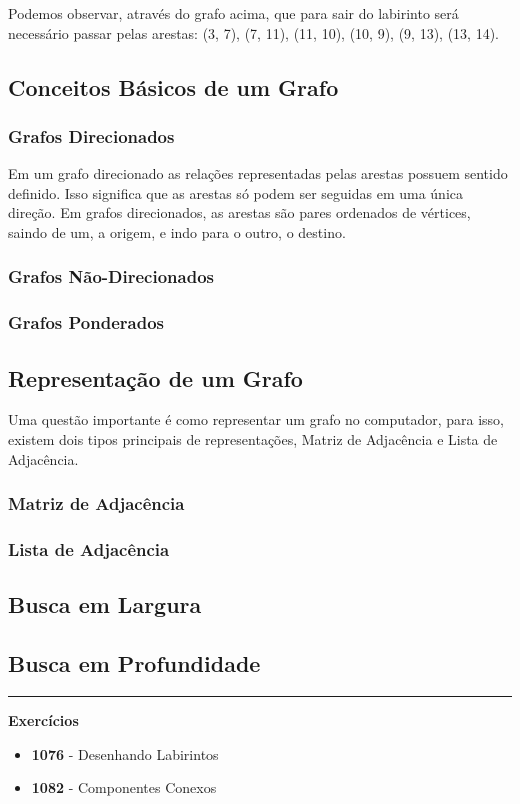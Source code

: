 Podemos observar, através do grafo acima, que para sair do labirinto será necessário passar pelas arestas: (3, 7), (7, 11), (11, 10), (10, 9), (9, 13), (13, 14). 

\subsection{Conceitos Básicos de um Grafo}

\subsubsection{Grafos Direcionados}
Em um grafo direcionado as relações representadas pelas arestas possuem sentido definido. Isso significa que as arestas só podem ser seguidas em uma única direção. Em grafos direcionados, as arestas são pares ordenados de vértices, saindo de um, a origem, e indo para o outro, o destino.
\subsubsection{Grafos Não-Direcionados}
\subsubsection{Grafos Ponderados}

\subsection{Representação de um Grafo}
Uma questão importante é como representar um grafo no computador, para isso, existem dois tipos principais de representações, Matriz de Adjacência e Lista de Adjacência.

\subsubsection{Matriz de Adjacência}
\subsubsection{Lista de Adjacência}

\subsection{Busca em Largura}
\subsection{Busca em Profundidade}

\vspace{1cm}
\rule{\textwidth}{0.4pt}
\large{\textbf{Exercícios}}\\

\begin{itemize}
    \item \textbf{1076} - Desenhando Labirintos
    \item \textbf{1082} - Componentes Conexos
\end{itemize}

\newpage